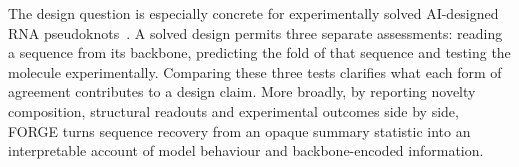 The design question is especially concrete for experimentally solved AI-designed
RNA pseudoknots~\citep{townley2026openknot}.
A solved design permits three separate assessments: reading a sequence from
its backbone, predicting the fold of that sequence and testing the molecule
experimentally. Comparing these three tests clarifies what each form of agreement contributes to a design claim. More broadly, by reporting novelty composition, structural readouts and experimental outcomes side by side, FORGE turns sequence recovery from an opaque summary statistic into an interpretable account of model behaviour and backbone-encoded information.
